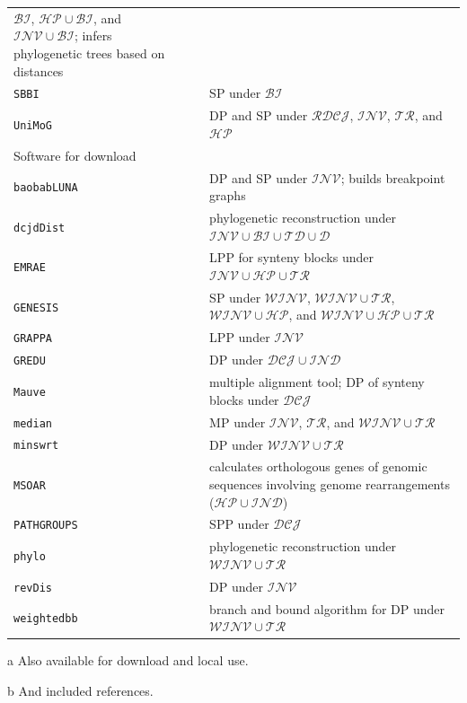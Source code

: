 \documentclass{svmult}
\newcommand{\m}[1]{\mathcal{#1}}
\begin{document}
\begin{table}
\begin{center}
\begin{threeparttable}
\begin{tabular}{l l p{7.2cm}}
    $\m{BI}$, $\m{HP}\cup\m{BI}$, and $\m{INV}\cup\m{BI}$; infers
    phylogenetic trees based on distances \\
    \texttt{SBBI}\tnote{a} & \cite{Christie_1996,SBBI} & SP under $\m{BI}$\\
    \texttt{UniMoG}\tnote{a} & \cite{UniMoG} & DP and SP under
    $\m{RDCJ}$, $\m{INV}$, $\m{TR}$, and $\m{HP}$     \vspace{0.2cm}\\
    Software for download & & \\
    \hline
    \texttt{baobabLUNA} & \cite{baobabLUNA,Braga_2009b}& DP and SP under $\m{INV}$; builds breakpoint
    graphs\\
    \texttt{dcjdDist} & \cite{DCJDDIST,Bader_2009} &  phylogenetic
    reconstruction under $\m{INV}\cup\m{BI}\cup\m{TD}\cup\m{D}$\\
    \texttt{EMRAE} & \cite{EMRAE,Zhao_2009} & LPP for synteny blocks
    under $\m{INV}\cup\m{HP}\cup\m{TR}$ \\
    \texttt{GENESIS} & \cite{Gog_2008,GENESIS} & SP under
   	 $\m{WINV}$, $\m{WINV}\cup\m{TR}$, $\m{WINV}\cup\m{HP}$, and
    $\m{WINV}\cup \m{HP} \cup \m{TR}$\\
    \texttt{GRAPPA} & \cite{GRAPPA,Moret_2001}& LPP under $\m{INV}$\\
    \texttt{GREDU} & \cite{GREDU,Shao_2014} & DP under
    $\m{DCJ}\cup\m{IND}$\\
    \texttt{Mauve} & \cite{Darling_2004,Mauve}& multiple alignment tool; 
    DP of synteny blocks under $\m{DCJ}$ \\
    \texttt{median} & \cite{Bader_2008,PHYLO}\tnote{b} &
    MP under $\m{INV}$, $\m{TR}$, and $\m{WINV}\cup\m{TR}$\\
    \texttt{minswrt} &
    \cite{Bader_2008,PHYLO}\tnote{b} & DP under $\m{WINV}\cup\m{TR}$\\
    \texttt{MSOAR} & \cite{Zheng_2007,MSOAR}& calculates orthologous
    genes of genomic sequences involving genome rearrangements ($\m{HP}\cup
    \m{IND}$) \\
    \texttt{PATHGROUPS} & \cite{Zheng_2011,Pathgroups} & SPP under $\m{DCJ}$\\
    \texttt{phylo} & \cite{Bader_2008,PHYLO} & phylogenetic
    reconstruction under  $\m{WINV}\cup\m{TR}$\\
    \texttt{revDis} & \cite{Bader_2008,PHYLO}\tnote{b} & DP
    under $\m{INV}$ \\
    \texttt{weightedbb} & \cite{Bader_2008,PHYLO}\tnote{b} & branch and
    bound algorithm for DP under $\m{WINV}\cup\m{TR}$\\
    \hline
  \end{tabular}
  \label{table:tools}
  \begin{tablenotes}
    \item[a] Also available for download and local use.
    \item[b] And included references.
\end{tablenotes}
\end{threeparttable}
\end{center}
\end{table}
\end{document}
